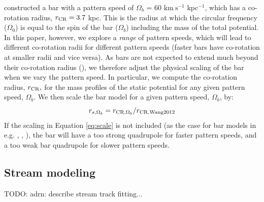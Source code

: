 \documentclass[twocolumn]{aastex62}
\newcommand{\msun}{\textrm{M}_\odot}
\newcommand{\kms}{\ensuremath{\textrm{km}~\textrm{s}^{-1}}}
\newcommand{\todo}[1]{{\color{red} TODO: #1}}
\begin{document}
\citet{wang:2012} constructed a bar with a pattern speed of $\Omega_b$ =  60 $\kms$ kpc$^{-1}$, which has a co-rotation radius, $r_{\rm CR} = 3.7$ kpc.
This is the radius at which the circular frequency ($\Omega_0$) is equal to the spin of the bar ($\Omega_b$) including the mass of the total potential.
In this paper, however, we explore a {\it range} of pattern speeds, which will lead to different co-rotation radii for different pattern speeds (faster bars have co-rotation at smaller radii and vice versa).
As bars are not expected to extend much beyond their co-rotation radius (\citealt{binney:2008}), we therefore adjust the physical scaling of the bar when we vary the pattern speed. %
In particular, we compute the co-rotation radius, $r_{\rm CR},$ for the mass profiles of the static potential for any given pattern speed, $\Omega_b$.
We then scale the bar model for a given pattern speed, $\Omega_b$, by:
\begin{equation}\label{eq:scale}
r_{s, \Omega_b}  = r_{{\rm CR}, \Omega_b}/r_{{\rm CR, Wang 2012}}
\end{equation}
If the scaling in Equation \ref{eq:scale} is not included (as the case for bar models in e.g. %
\citealt{Pearson:2017}, \citealt{Erkal:2017}, \citealt{Banik:2019}), the bar will have a too strong quadrupole for faster pattern speeds, and a too weak bar quadrupole for  slower pattern speeds.

%


\subsection{Stream modeling}
\label{sec:modeling}

\todo{adrn: describe stream track fitting...}
\end{document}
